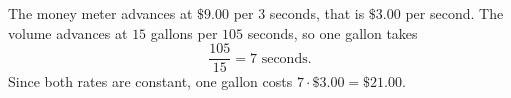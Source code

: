 The money meter advances at $\$9.00$ per $3$ seconds, that is $\$3.00$ per second. The volume advances at $15$ gallons per $105$ seconds, so one gallon takes
\[
\dfrac{105}{15}=7\text{ seconds}.
\]
Since both rates are constant, one gallon costs $7\cdot \$3.00=\boxed{\$21.00}$.
